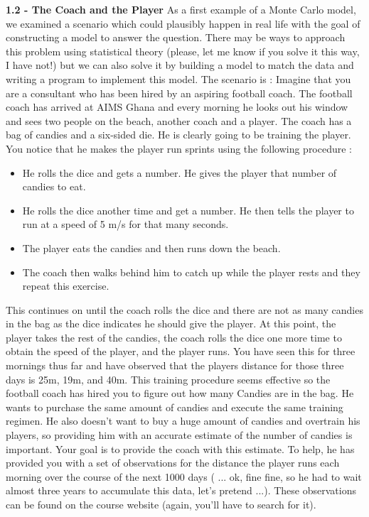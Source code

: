\documentclass[12pt]{article}
\begin{document}
\newpage

\textbf{1.2 - The Coach and the Player}
\newline
As a first example of a Monte Carlo model, we examined a scenario which could plausibly happen in real life with the goal of constructing a model to answer the question.  There may be ways to approach this problem using statistical theory (please, let me know if you solve it this way, I have not!) but we can also solve it by building a model to match the data and writing a program to implement this model.  The scenario is :
\newline
\newline
Imagine that you are a consultant who has been hired by an aspiring football coach. The football coach has arrived at AIMS Ghana and every morning he looks out his window and sees two people on the beach, another coach and a player. The coach has a bag of candies and a six-sided die. He is clearly going to be training the player. You notice that he makes the player run sprints using the following procedure :

\begin{itemize}
\item He rolls the dice and gets a number.  He gives the player that number of candies to eat.
\item He rolls the dice another time and get a number. He then tells the player to run at a speed of 5 m/s for that many seconds.
\item The player eats the candies and then runs down the beach. 
\item The coach then walks behind him to catch up while the player rests and they repeat this exercise.
\end{itemize}


This continues on until the coach rolls the dice and there are not as many candies in the bag as the dice indicates he should give the player.  At this point, the player takes the rest of the candies, the coach rolls the dice one more time to obtain the speed of the player, and the player runs. You have seen this for three mornings thus far and have observed that the players distance for those three days is 25m, 19m, and 40m.
\newline
This training procedure seems effective so the football coach has hired you to figure out how many Candies are in the bag. He wants to purchase the same amount of candies and execute the same training regimen. He also doesn't want to buy a huge amount of candies and overtrain his players, so providing him with an accurate estimate of the number of candies is important.
\newline
\newline
Your goal is to provide the coach with this estimate.
\newline
\newline
To help, he has provided you with a set of observations for the distance the player runs each morning over the course of the next 1000 days ( ... ok, fine fine, so he had to wait almost three years to accumulate this data, let's pretend ...). These observations can be found on the course website (again, you'll have to search for it).
\end{document}
